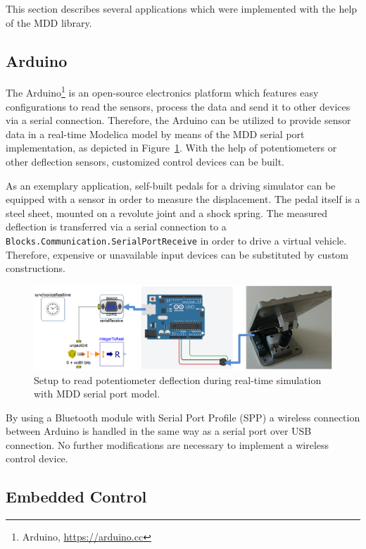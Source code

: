 \documentclass{resources/modelica}
\newcommand{\modelica}[1]{\lstinline[language=modelica]|#1|}
\begin{document}
This section describes several applications which were implemented with the
help of the MDD library.

\subsection{Arduino}

The Arduino\footnote{Arduino, \url{https://arduino.cc}} is an open-source electronics platform which features easy configurations to read the sensors, process the data and send it to other devices via a serial connection.
Therefore, the Arduino can be utilized to provide sensor data in a real-time Modelica model by means of the MDD serial port implementation, as depicted in Figure~\ref{fig:arduino}.
With the help of potentiometers or other deflection sensors, customized control devices can be built.

As an exemplary application, self-built pedals for a driving simulator can be equipped with a sensor in order to measure the displacement. The pedal itself is a steel sheet, mounted on a revolute joint and a shock spring.
The measured deflection is transferred via a serial connection to a \modelica{Blocks.Communication.SerialPortReceive} in order to drive a virtual vehicle.
Therefore, expensive or unavailable input devices can be substituted by custom constructions.
\begin{figure}[h]
  \centering
  \includegraphics[width=0.9\columnwidth]{figures/arduino}
  \caption{Setup to read potentiometer deflection during real-time simulation with MDD serial port model\protect\footnotemark.}
  \label{fig:arduino}
\end{figure}
\noindent
By using a Bluetooth module with Serial Port Profile (SPP) a wireless connection between Arduino is handled in the same way as a serial port over USB connection.
No further modifications are necessary to implement a wireless control device.

\subsection{Embedded Control}
\label{sec:EmbeddedControl}
\end{document}
